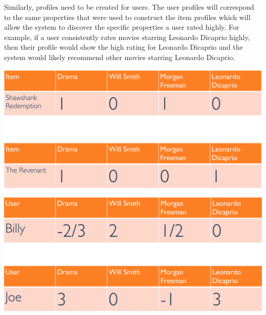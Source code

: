 \documentclass[11pt,reqno]{amsart}
\theoremstyle{definition}
\numberwithin{equation}{subsection}
\begin{document}
\begin{center}
\end{center}


Similarly, profiles need to be created for users. The user profiles will correspond to the same properties that were used to construct the item profiles which will allow the system to discover the specific properties a user rated highly. For example, if a user consistently  rates movies starring Leonardo Dicaprio highly, then their profile would show the high rating for Leonardo Dicaprio and the system would likely recommend other movies starring Leonardo Dicaprio.\newline



\includegraphics[width=\textwidth]{pic2}


\includegraphics[width=\textwidth]{pic3}
\end{document}
